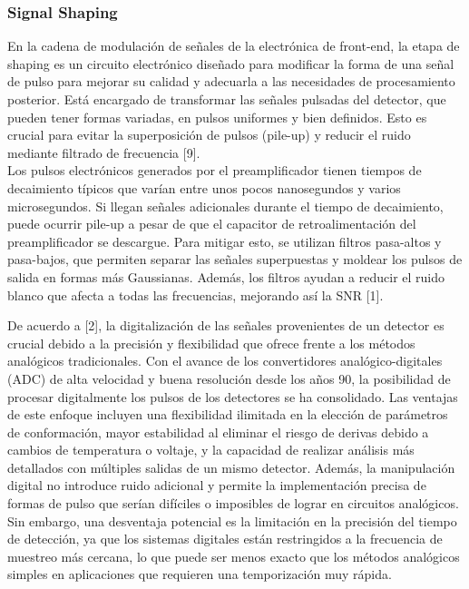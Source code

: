 \documentclass[]{book}
\begin{document}
\subsubsection{Signal Shaping}

\noindent En la cadena de modulación de señales de la electrónica de front-end, la etapa de shaping es un circuito electrónico diseñado para modificar la forma de una señal de pulso para mejorar su calidad y adecuarla a las necesidades de procesamiento posterior. Está encargado de transformar las señales pulsadas del detector, que pueden tener formas variadas, en pulsos uniformes y bien definidos. Esto es crucial para evitar la superposición de pulsos (pile-up) y reducir el ruido mediante filtrado de frecuencia [9].\\

\noindent Los pulsos electrónicos generados por el preamplificador tienen tiempos de decaimiento típicos que varían entre unos pocos nanosegundos y varios microsegundos. Si llegan señales adicionales durante el tiempo de decaimiento, puede ocurrir pile-up a pesar de que el capacitor de retroalimentación del preamplificador se descargue. Para mitigar esto, se utilizan filtros pasa-altos y pasa-bajos, que permiten separar las señales superpuestas y moldear los pulsos de salida en formas más Gaussianas. Además, los filtros ayudan a reducir el ruido blanco que afecta a todas las frecuencias, mejorando así la SNR [1].


\noindent De acuerdo a [2], la digitalización de las señales provenientes de un detector es crucial debido a la precisión y flexibilidad que ofrece frente a los métodos analógicos tradicionales. Con el avance de los convertidores analógico-digitales (ADC) de alta velocidad y buena resolución desde los años 90, la posibilidad de procesar digitalmente los pulsos de los detectores se ha consolidado. Las ventajas de este enfoque incluyen una flexibilidad ilimitada en la elección de parámetros de conformación, mayor estabilidad al eliminar el riesgo de derivas debido a cambios de temperatura o voltaje, y la capacidad de realizar análisis más detallados con múltiples salidas de un mismo detector. Además, la manipulación digital no introduce ruido adicional y permite la implementación precisa de formas de pulso que serían difíciles o imposibles de lograr en circuitos analógicos. Sin embargo, una desventaja potencial es la limitación en la precisión del tiempo de detección, ya que los sistemas digitales están restringidos a la frecuencia de muestreo más cercana, lo que puede ser menos exacto que los métodos analógicos simples en aplicaciones que requieren una temporización muy rápida.\\
\end{document}
